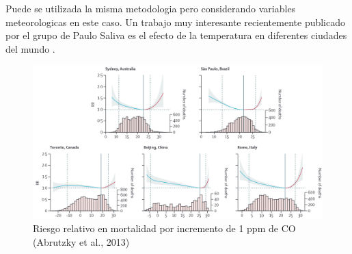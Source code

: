 \documentclass[]{book}
\begin{document}
Puede se utilizada la misma metodologia pero considerando variables meteorologicas en este caso. Un trabajo muy interesante recientemente publicado por el grupo de Paulo Saliva es el efecto de la temperatura en diferentes ciudades del mundo \citep{GASPARRINI2015369}.

\begin{figure}
\includegraphics[width=18.97in,height=1.8\textheight]{figs/temp1} \caption{Riesgo relativo en mortalidad por incremento de 1 ppm de CO (Abrutzky et al., 2013)}\label{fig:unnamed-chunk-66}
\end{figure}


\end{document}
